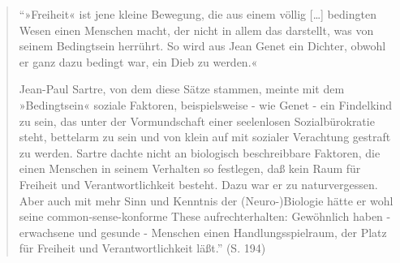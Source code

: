 \documentclass[
  a4paper,
]{report}
\begin{document}
\begin{quote}
``»Freiheit« ist jene kleine Bewegung, die aus einem völlig {[}\ldots{]} bedingten Wesen einen Menschen macht, der nicht in allem das darstellt, was von seinem Bedingtsein herrührt. So wird aus Jean Genet ein Dichter, obwohl er ganz dazu bedingt war, ein Dieb zu werden.«

Jean-Paul Sartre, von dem diese Sätze stammen, meinte mit dem »Bedingtsein« soziale Faktoren, beispielsweise - wie Genet - ein Findelkind zu sein, das unter der Vormundschaft einer seelenlosen Sozialbürokratie steht, bettelarm zu sein und von klein auf mit sozialer Verachtung gestraft zu werden. Sartre dachte nicht an biologisch beschreibbare Faktoren, die einen Menschen in seinem Verhalten so festlegen, daß kein Raum für Freiheit und Verantwortlichkeit besteht. Dazu war er zu naturvergessen. Aber auch mit mehr Sinn und Kenntnis der (Neuro-)Biologie hätte er wohl seine common-sense-konforme These aufrechterhalten: Gewöhnlich haben - erwachsene und gesunde - Menschen einen Handlungsspielraum, der Platz für Freiheit und Verantwortlichkeit läßt.'' (S. 194)
\end{quote}
\end{document}
